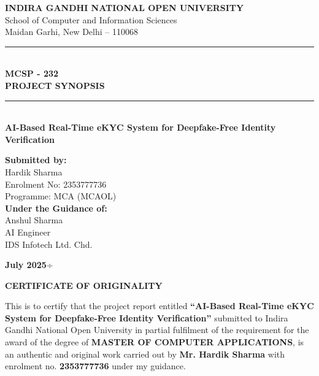 \documentclass[12pt,a4paper]{article}
\begin{document}
\begin{titlepage}
    \centering
    \vspace*{1cm}
    
    {\Large \textbf{INDIRA GANDHI NATIONAL OPEN UNIVERSITY}}\\[0.5cm]
    {\large School of Computer and Information Sciences}\\[0.3cm]
    {\large Maidan Garhi, New Delhi – 110068}\\[1.5cm]
    
    \rule{\textwidth}{1.5pt}\\[0.4cm]
    {\LARGE \textbf{MCSP - 232}}\\[0.3cm]
    {\Large \textbf{PROJECT SYNOPSIS}}\\[0.4cm]
    \rule{\textwidth}{1.5pt}\\[1.5cm]
    
    {\Large \textbf{AI-Based Real-Time eKYC System for Deepfake-Free Identity Verification}}\\[2.5cm]
    
    \begin{flushleft}
    {\large \textbf{Submitted by:}}\\[0.2cm]
    {\large Hardik Sharma}\\
    {\large Enrolment No: 2353777736}\\
    {\large Programme: MCA (MCAOL)}\\[1cm]
    
    {\large \textbf{Under the Guidance of:}}\\[0.2cm]
    {\large Anshul Sharma}\\
    {\large AI Engineer}\\
    {\large IDS Infotech Ltd. Chd.}\\[1.5cm]
    \end{flushleft}
    
    \vfill
    {\large \textbf{July 2025}}÷
    
\end{titlepage}

\newpage
\thispagestyle{empty}

\begin{center}
    {\Large \textbf{CERTIFICATE OF ORIGINALITY}}
\end{center}

\vspace{1.5cm}

This is to certify that the project report entitled \textbf{``AI-Based Real-Time eKYC System for Deepfake-Free Identity Verification''} submitted to Indira Gandhi National Open University in partial fulfilment of the requirement for the award of the degree of \textbf{MASTER OF COMPUTER APPLICATIONS}, is an authentic and original work carried out by \textbf{Mr. Hardik Sharma} with enrolment no. \textbf{2353777736} under my guidance.
\end{document}
